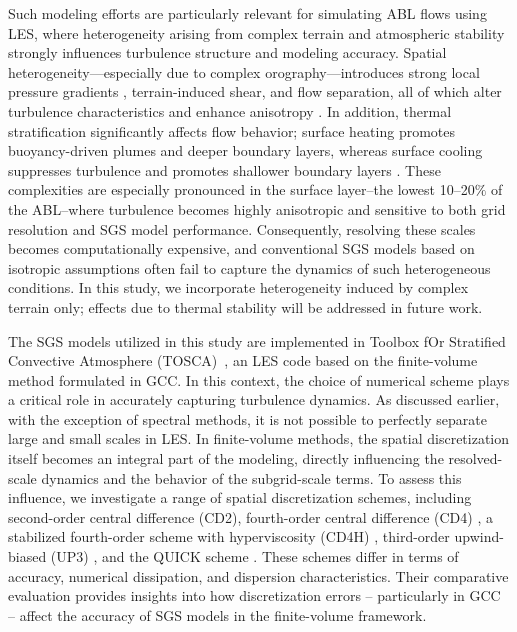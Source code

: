 \documentclass[final,3p]{elsarticle}
\begin{document}
Such modeling efforts are particularly relevant for simulating ABL flows using LES, where heterogeneity arising from complex terrain and atmospheric stability strongly influences turbulence structure and modeling accuracy. Spatial heterogeneity---especially due to complex orography---introduces strong local pressure gradients \cite{cai2021local}, terrain-induced shear, and flow separation, all of which alter turbulence characteristics and enhance anisotropy \cite{abedi2023assessment}. 
In addition, thermal stratification significantly affects flow behavior; surface heating promotes buoyancy-driven plumes and deeper boundary layers, whereas surface cooling suppresses turbulence and promotes shallower boundary layers \cite{wurps2020grid,gadde2021large}. These complexities are especially pronounced in the surface layer--the lowest 10–20$\%$ of the ABL--where turbulence becomes highly anisotropic and sensitive to both grid resolution and SGS model performance. Consequently, resolving these scales becomes computationally expensive, and conventional SGS models based on isotropic assumptions often fail to capture the dynamics of such heterogeneous conditions. In this study, we incorporate heterogeneity induced by complex terrain only; effects due to thermal stability will be addressed in future work.

The SGS models utilized in this study are implemented in Toolbox fOr Stratified Convective Atmosphere (TOSCA)~\cite{stipa2024tosca}, an LES code based on the finite-volume method formulated in GCC. In this context, the choice of numerical scheme plays a critical role in accurately capturing turbulence dynamics. As discussed earlier, with the exception of spectral methods, it is not possible to perfectly separate large and small scales in LES. In finite-volume methods, the spatial discretization itself becomes an integral part of the modeling, directly influencing the resolved-scale dynamics and the behavior of the subgrid-scale terms. To assess this influence, we investigate a range of spatial discretization schemes, including second-order central difference (CD2), fourth-order central difference (CD4) \cite{hundsdorfer1995positive,wicker2002time}, a stabilized fourth-order scheme with hyperviscosity (CD4H) \cite{kosovic2016improving,skamarock2011conservative}, third-order upwind-biased (UP3) \cite{skamarock2011conservative}, and the QUICK scheme \cite{leonard1979}. These schemes differ in terms of accuracy, numerical dissipation, and dispersion characteristics. Their comparative evaluation provides insights into how discretization errors -- particularly in GCC -- affect the accuracy of SGS models in the finite-volume framework.
\end{document}
